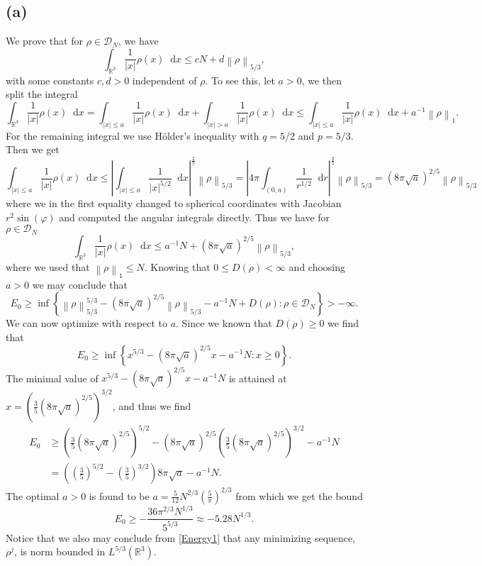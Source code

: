 \documentclass[a4paper,11pt]{article}
\newcommand{\norm}[1]{\left\lVert #1 \right\rVert}
\newcommand{\abs}[1]{\left\lvert #1 \right\rvert}
\newcommand*\diff{\mathop{}\!\mathrm{d}}
\newcommand{\R}{\mathbb{R}}
\numberwithin{equation}{section}
\begin{document}
\subsection*{(a)}
We prove that for $ \rho\in \mathcal{D}_N $, we have\begin{equation}
\int_{\R^3}\frac{1}{\abs{x}}\rho(x)\diff x\leq cN+d\norm{\rho}_{5/3},
\end{equation}
with some constants $ c,d>0 $ independent of $ \rho $. To see this, let $a>0$, we then split the integral \begin{equation}
\int_{\R^3}\frac{1}{\abs{x}}\rho(x)\diff x=\int_{\abs{x}\leq a}\frac{1}{\abs{x}}\rho(x)\diff x+\int_{\abs{x}>a}\frac{1}{\abs{x}}\rho(x)\diff x\leq\int_{\abs{x}\leq a}\frac{1}{\abs{x}}\rho(x)\diff x+a^{-1}\norm{\rho}_1.
\end{equation}
For the remaining integral we use H\"older's inequality with $ q=5/2 $  and $ p=5/3 $. Then we get \begin{equation}
\int_{\abs{x}\leq a}\frac{1}{\abs{x}}\rho(x)\diff x\leq\abs{\int_{\abs{x}\leq a}\frac{1}{\abs{x}^{5/2}}\diff x}^{\frac{2}{5}}\norm{\rho}_{5/3}=\abs{4\pi \int_{(0,a)}\frac{1}{r^{1/2}}\diff r}^{\frac{2}{5}}\norm{\rho}_{5/3}=(8\pi\sqrt{a})^{2/5}\norm{\rho}_{5/3}
\end{equation}
where we in the first equality changed to spherical coordinates with Jacobian $ r^2\sin(\varphi) $ and computed the angular integrals directly. Thus we have for $ \rho\in \mathcal{D}_N $ \begin{equation}
\int_{\R^3}\frac{1}{\abs{x}}\rho(x)\diff x\leq a^{-1}N+(8\pi\sqrt{a})^{2/5}\norm{\rho}_{5/3},
\end{equation}
where we used that $ \norm{\rho}_1\leq N $.
Knowing that $ 0\leq D(\rho)<\infty $ and choosing $ a>0$ we may conclude that \begin{equation}
E_0\geq\inf\left\{\norm{\rho}_{5/3}^{5/3}-(8\pi\sqrt{a})^{2/5}\norm{\rho}_{5/3}-a^{-1}N+D(\rho) : \rho\in\mathcal{D}_N\right\}>-\infty.\label{Energy1}
\end{equation}
We can now optimize with respect to $ a $. Since we known that $ D(\rho)\geq0 $ we find that 
$$ E_0\geq\inf\left\{x^{5/3}-(8\pi\sqrt{a})^{2/5}x-a^{-1}N:x\geq0\right\}.$$
The minimal value of $ x^{5/3}-(8\pi\sqrt{a})^{2/5}x-a^{-1}N $ is attained at $ x=\left(\frac{3}{5}(8\pi\sqrt{a})^{2/5}\right)^{3/2} $, and thus we find
\begin{equation}
\begin{aligned}
E_0&\geq \left(\frac{3}{5}(8\pi\sqrt{a})^{2/5}\right)^{5/2}-(8\pi\sqrt{a})^{2/5}\left(\frac{3}{5}(8\pi\sqrt{a})^{2/5}\right)^{3/2}-a^{-1}N\\
&=\left(\left(\frac{3}{5}\right)^{5/2}-\left(\frac{3}{5}\right)^{3/2}\right)8\pi\sqrt{a}-a^{-1}N.
\end{aligned}
\end{equation}
The optimal $ a>0 $ is found to be $ a=\frac{5}{12}N^{2/3}\left(\frac{5}{\pi}\right)^{2/3} $ from which we get the bound
\begin{equation}
E_0\geq -\frac{36 \pi ^{2/3} N^{1/3}}{5^{5/3}}\approx-5.28 N^{1/3}.
\end{equation}
Notice that we also may conclude from \eqref{Energy1} that any minimizing sequence, $ \rho^j $, is norm bounded in $ L^{5/3}(\R^3) $.
\end{document}
